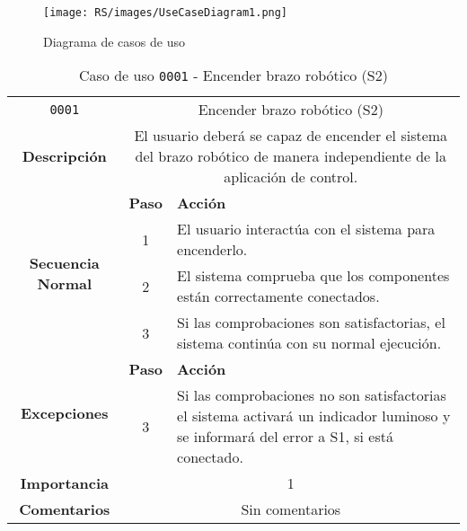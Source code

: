 

\begin{figure}[H]
    \centering
    \texttt{[image: RS/images/UseCaseDiagram1.png]}
    \caption{Diagrama de casos de uso}
    \label{fig:diagrama_casos_uso}
\end{figure}


\begin{table}[H]
    \centering
    \begin{tabularx}{\textwidth}{|c|c|X|}
        \cline{1-3}
        \texttt{0001}                              & \multicolumn{2}{c|}{Encender brazo robótico (\ac{S2})}                                                                                                                      \\ \cline{1-3}
        \textbf{Descripción}                       & \multicolumn{2}{m{13cm}|}{El usuario deberá se capaz de encender el sistema del brazo robótico de manera independiente de la aplicación de control.}
        \\ \cline{1-3}
        \multirow{4}{*}{\textbf{Secuencia Normal}} & \textbf{Paso} & \textbf{Acción}
        \\ \cline{2-3}                    &   1  & El usuario interactúa con el sistema para encenderlo.
        \\ \cline{2-3}                    &   2  & El sistema comprueba que los componentes están correctamente conectados.
        \\ \cline{2-3}                    &   3  & Si las comprobaciones son satisfactorias, el sistema continúa con su normal ejecución.
        \\ \cline{1-3}
        \multirow{2}{*}{\textbf{Excepciones}}      & \textbf{Paso}                                                                                                                                        & \textbf{Acción}
        \\ \cline{2-3}                    &   3  & Si las comprobaciones no son satisfactorias el sistema activará un indicador luminoso y se informará del error a \ac{S1}, si está conectado.
        \\ \cline{1-3}
        \textbf{Importancia}                       & \multicolumn{2}{c|}{1}                                                                                                                                                 \\ \cline{1-3}
        \textbf{Comentarios}                       & \multicolumn{2}{c|}{Sin comentarios}                                                                                                                                   \\ \cline{1-3}
    \end{tabularx}
    \caption{Caso de uso \texttt{0001} - Encender brazo robótico (\ac{S2})}
    \label{tab:CU0001}
    \label{tab:caso_de_uso_encender_brazo_robotico}
\end{table}

